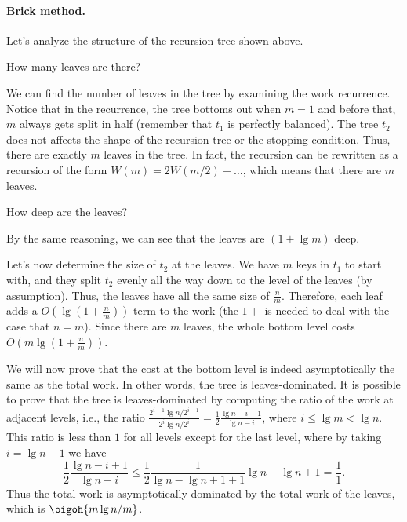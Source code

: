 \begin{chapter}
\paragraph{Brick method.}
Let's analyze the structure of the recursion tree shown above.
%
\begin{question}
How many leaves are there?
\end{question}
%
We can find the number of leaves in the tree by examining the work
recurrence.  Notice that in the recurrence, the tree bottoms out when
$m = 1$ and before that, $m$ always gets split in half (remember that
$t_1$ is perfectly balanced).  The tree $t_2$ does not affects the
shape of the recursion tree or the stopping condition. Thus, there are
exactly $m$ leaves in the tree.  
%
In fact, the recursion can be rewritten as a recursion of the form
$W(m) = 2W(m/2) + \ldots $, which means that there are $m$ leaves.
%
\begin{question}
How deep are the leaves?
\end{question}
%
By the same reasoning, we can see that the leaves are $(1 + \lg m)$
deep.

Let's now determine the size of $t_2$ at the leaves.  
%
We have $m$ keys in $t_1$ to start with, and they split $t_2$ evenly
all the way down to the level of the leaves (by assumption). Thus, the
leaves have all the same size of $\frac{n}{m}$.
%
Therefore, each leaf adds a $O(\lg (1+\frac{n}{m}))$ term to the work
(the $1+$ is needed to deal with the case that $n = m$).  Since there
are $m$ leaves, the whole bottom level costs $O(m \lg (1+
\frac{n}{m}))$.  

We will now prove that the cost at the bottom level is indeed
asymptotically the same as the total work.  In other words, the tree
is leaves-dominated.  It is possible to prove that the tree is
leaves-dominated by computing the ratio of the work at adjacent
levels, i.e., the ratio $\frac{2^{i-1}  \lg{n/2^{i-1}}}{2^i 
  \lg{n/2^{i}}} = \frac{1}{2} \frac{\lg{n} - i + 1 }{\lg{n} - i}$,
where $i \le \lg{m} < \lg{n}$. This ratio is less than $1$ for all
levels except for the last level, where by taking $i = \lg{n} - 1$ we
have
\[
 \frac{1}{2} \frac{\lg{n} - i +1 }{\lg{n} - i}
 \le
 \frac{1}{2} \frac{1}{\lg{n} - \lg{n} +1 + 1}{\lg{n} - \lg{n}+1}
= \frac{1}{1}.
\]
Thus the total work is asymptotically dominated by the total work of
the leaves, which is $\bigoh{m\lg{n/m}}$.



\end{chapter}

